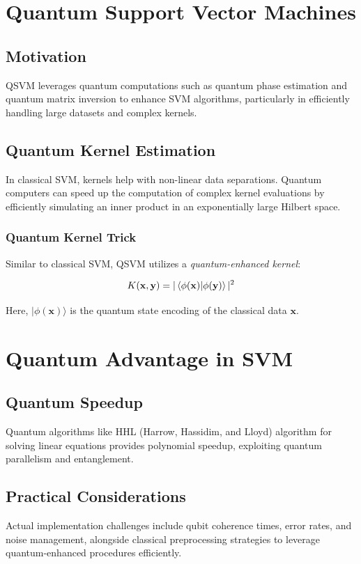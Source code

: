 \documentclass{article}
\begin{document}
\section{Quantum Support Vector Machines}

\subsection{Motivation}
QSVM leverages quantum computations such as quantum phase estimation and quantum matrix inversion to enhance SVM algorithms, particularly in efficiently handling large datasets and complex kernels.

\subsection{Quantum Kernel Estimation}
In classical SVM, kernels help with non-linear data separations. Quantum computers can speed up the computation of complex kernel evaluations by efficiently simulating an inner product in an exponentially large Hilbert space.

\subsubsection{Quantum Kernel Trick}
Similar to classical SVM, QSVM utilizes a \textit{quantum-enhanced kernel}:

\[
K(\mathbf{x}, \mathbf{y}) = |\braket{\phi(\mathbf{x}) | \phi(\mathbf{y})}|^2
\]

Here, \(|\phi(\mathbf{x})\rangle\) is the quantum state encoding of the classical data \(\mathbf{x}\).

\section{Quantum Advantage in SVM}

\subsection{Quantum Speedup}
Quantum algorithms like HHL (Harrow, Hassidim, and Lloyd) algorithm for solving linear equations provides polynomial speedup, exploiting quantum parallelism and entanglement.

\subsection{Practical Considerations}
Actual implementation challenges include qubit coherence times, error rates, and noise management, alongside classical preprocessing strategies to leverage quantum-enhanced procedures efficiently.
\end{document}
